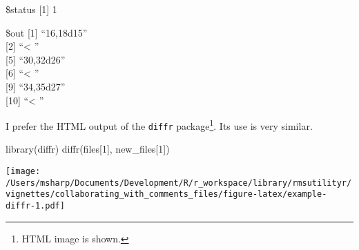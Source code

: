 \documentclass[
]{article}
\newenvironment{Shaded}{\begin{snugshade}}{\end{snugshade}}
\newcommand{\DecValTok}[1]{\textcolor[rgb]{0.00,0.00,0.81}{#1}}
\newcommand{\FunctionTok}[1]{\textcolor[rgb]{0.00,0.00,0.00}{#1}}
\newcommand{\NormalTok}[1]{#1}
\begin{document}
\$status {[}1{]} 1

\$out {[}1{]} ``16,18d15''\\
{[}2{]} ``\textless{} ''\\
{[}5{]} ``30,32d26''\\
{[}6{]} ``\textless{} ''\\
{[}9{]} ``34,35d27''\\
{[}10{]} ``\textless{} ''

I prefer the HTML output of the \texttt{diffr} package\footnote{HTML
  image is shown.}. Its use is very similar.

\begin{Shaded}
\begin{Highlighting}[]
\FunctionTok{library}\NormalTok{(diffr)}
\FunctionTok{diffr}\NormalTok{(files[}\DecValTok{1}\NormalTok{], new\_files[}\DecValTok{1}\NormalTok{])}
\end{Highlighting}
\end{Shaded}

\texttt{[image: /Users/msharp/Documents/Development/R/r\_workspace/library/rmsutilityr/vignettes/collaborating\_with\_comments\_files/figure-latex/example-diffr-1.pdf]}
\end{document}

